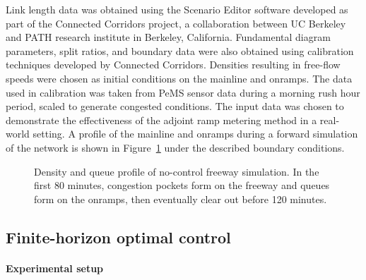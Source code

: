 								
				Link length data was obtained using the Scenario Editor software developed
				as part of the Connected Corridors project, a collaboration between
				UC Berkeley and PATH research institute in Berkeley, California.
				Fundamental diagram parameters, split ratios, and boundary data were
				also obtained using calibration techniques developed by Connected
				Corridors. Densities resulting in free-flow speeds were chosen as
				initial conditions on the mainline and onramps. The data used in calibration
				was taken from PeMS sensor data during a morning rush hour period,
				scaled to generate congested conditions. The input data was chosen
				to demonstrate the effectiveness of the adjoint ramp metering method
				in a real-world setting. A profile of the mainline and onramps during
				a forward simulation of the network is shown in Figure~\ref{fig:Density-and-queue}
				under the described boundary conditions.
				\begin{figure}[b]
					\hfill{}
																
								\caption{Density and queue profile of no-control freeway simulation. In the
									first 80 minutes, congestion pockets form on the freeway and queues
									form on the onramps, then eventually clear out before 120 minutes.\label{fig:Density-and-queue}}
							\end{figure}
														
														
														
							\subsection{Finite-horizon optimal control\label{sub:Finite-horizon-optimal-control}}
														
														
							\paragraph{Experimental setup}
														
